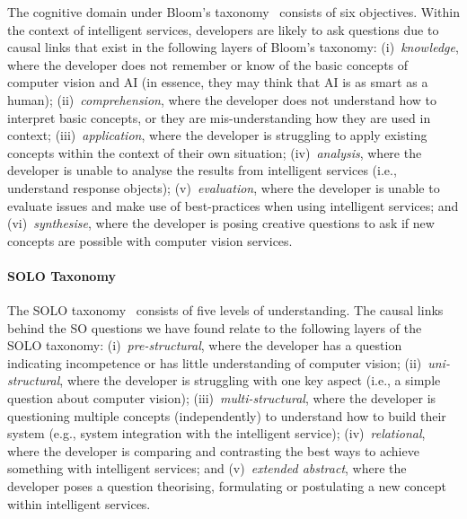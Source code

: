 The cognitive domain under Bloom's taxonomy~\citep{Krathwohl:2001wr} consists of six objectives. Within the context of intelligent services, developers are likely to ask questions due to causal links that exist in the following layers of Bloom's taxonomy: 
(i)~\textit{knowledge}, where the developer does not remember or know of the basic concepts of computer vision and AI (in essence, they may think that AI is as smart as a human);
(ii)~\textit{comprehension}, where the developer does not understand how to interpret basic concepts, or they are mis-understanding how they are used in context;
(iii)~\textit{application}, where the developer is struggling to apply existing concepts within the context of their own situation;
(iv)~\textit{analysis}, where the developer is unable to analyse the results from intelligent services (i.e., understand response objects);
(v)~\textit{evaluation}, where the developer is unable to evaluate issues and make use of best-practices when using intelligent services; and
(vi)~\textit{synthesise}, where the developer is posing creative questions to ask if new concepts are possible with computer vision services.

\paragraph{SOLO Taxonomy}

The SOLO taxonomy~\citep{Biggs:2014ur} consists of five levels of understanding. The causal links behind the SO questions we have found relate to the following layers of the SOLO taxonomy:
(i)~\textit{pre-structural}, where the developer has a question indicating incompetence or has little understanding of computer vision;
(ii)~\textit{uni-structural}, where the developer is struggling with one key aspect (i.e., a simple question about computer vision);
(iii)~\textit{multi-structural}, where the developer is questioning multiple concepts (independently) to understand how to build their system (e.g., system integration with the intelligent service);
(iv)~\textit{relational}, where the developer is comparing and contrasting the best ways to achieve something with intelligent services; and
(v)~\textit{extended abstract}, where the developer poses a question theorising, formulating or postulating a new concept within intelligent services.

